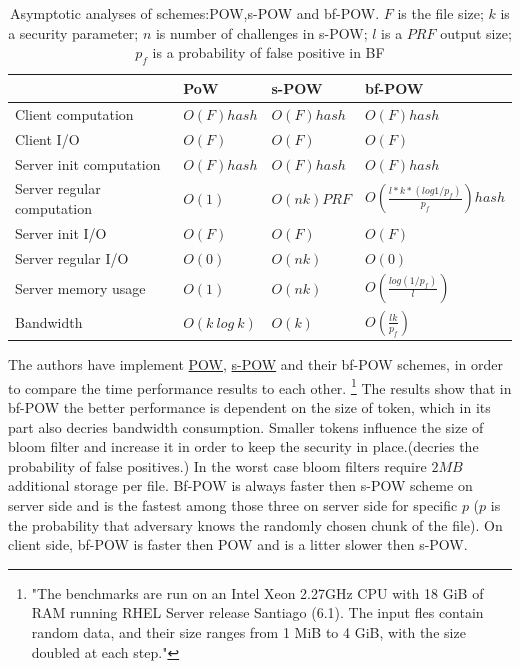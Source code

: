 \documentclass[12pt]{article}
\begin{document}
\begin{savenotes}
\begin{table}[!htpb]
\centering
\addtolength{\tabcolsep}{3pt}
\begin{tabular}{|L{5cm}|L{2.5cm}|L{2.5cm}|L{3.5cm}|}
\hline
&PoW&s-POW&bf-POW\\
\hline
Client computation&$O(F)hash$ & $O(F)hash$ & $O(F)hash$ \\
\hline
Client I/O&$O(F)$&$O(F)$&$O(F)$\\
\hline
Server init computation &$O(F) hash$&$O(F) hash$&$O(F)hash$\\
\hline
Server regular computation &$O(1)$&$O(nk) PRF$& $O(\frac{l*k*(log1/p_f)}{p_f})hash$\\
\hline
Server init I/O &$O(F)$&$O(F)$&$O(F)$\\
\hline
Server regular I/O &$O(0)$&$O(nk)$&$O(0)$\\
\hline
Server memory usage&$O(1)$&$O(nk)$&$O(\frac{log(1/p_f)}{l})$\\
\hline
Bandwidth&$O(k\ log\ k)$&$O(k)$&$O(\frac{lk}{p_f})$\\
\hline

\end{tabular}
\caption{Asymptotic analyses of schemes:POW,s-POW and bf-POW. $F$ is the file size; $k$ is a security parameter; $n$ is number of challenges in s-POW;  $l$ is a $PRF$ output size; $p_f$ is a probability of false positive in BF}
\label{table:asymptoticAnalysisBF-POW}
\end{table}
\end{savenotes}
 
The authors have implement \hyperref[sub:Soltuion1]{POW}, \hyperref[sub:Soltuion2]{s-POW} and their bf-POW schemes, in order to compare the time performance results to each other. \footnote{"The benchmarks are run on an Intel Xeon 2.27GHz CPU with 18 GiB of RAM running RHEL Server release Santiago (6.1). The input fles contain random data, and their size ranges from 1 MiB to 4 GiB, with the size doubled at each step."} The results show that in bf-POW the better performance is dependent on the size of token, which in its part also decries bandwidth consumption. Smaller tokens influence the size of bloom filter and increase it in order to keep the security in place.(decries the probability of false positives.)  In the worst case bloom filters require  $2MB$ additional storage per file. Bf-POW is always faster then s-POW scheme on server side and is the fastest  among those three on server side for specific $p$ ($p$ is the probability that adversary knows the randomly chosen chunk of the file). On client side, bf-POW is faster then POW and is a litter slower then s-POW.
 
\end{document}
